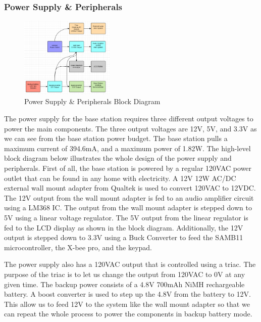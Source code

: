 \documentclass[journal,compsoc]{IEEEtran}
\begin{document}
\subsubsection {Power Supply \& Peripherals}

\begin{figure}[ht] 	%
\centering
\includegraphics[width=0.4\textwidth]{BlockDiagram.png}
\caption{ \space Power Supply \& Peripherals Block Diagram}
\label{Psupply}
\end{figure}

The power supply for the base station requires three different output voltages to power the main components. The three output voltages are 12V, 5V, and 3.3V as we can see from the base station power budget. The base station pulls a maximum current of 394.6mA, and a maximum power of 1.82W. The high-level block diagram below illustrates the whole design of the power supply and peripherals. First of all, the base station is powered by a regular 120VAC power outlet that can be found in any home with electricity. A 12V 12W AC/DC external wall mount adapter from Qualtek is used to convert 120VAC to 12VDC. The 12V output from the wall mount adapter is fed to an audio amplifier circuit using a LM368 IC. The output from the wall mount adapter is stepped down to 5V using a linear voltage regulator. The 5V output from the linear regulator is fed to the LCD display as shown in the block diagram. Additionally, the 12V output is stepped down to 3.3V using a Buck Converter to feed the SAMB11 microcontroller, the X-bee pro, and the keypad. 

The power supply also has a 120VAC output that is controlled using a triac. The purpose of the triac is to let us change the output from 120VAC to 0V at any given time. The backup power consists of a 4.8V 700mAh NiMH rechargeable battery. A boost converter is used to step up the 4.8V from the battery to 12V. This allow us to feed 12V to the system like the wall mount adapter so that we can repeat the whole process to power the components in backup battery mode.
\end{document}
